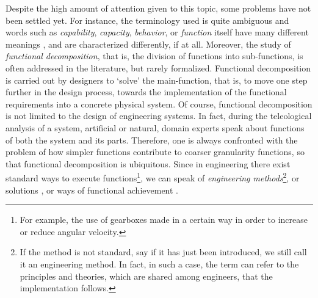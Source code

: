 \documentclass[sw]{iosart2x}
\newcommand{\firstTimeKeyWord}[1]{\textit{#1}}
\newcommand{\quotes}[1]{`#1'}
\newcommand{\myComment}[1]{}
\begin{document}
Despite the high amount of attention given to this topic, some problems have not been settled yet. 
For instance, the terminology used is quite ambiguous and words such as \firstTimeKeyWord{capability}, \firstTimeKeyWord{capacity}, \firstTimeKeyWord{behavior}, or \firstTimeKeyWord{function} itself have many different meanings \cite{borgoCapabilitiesCapacitiesFunctionalities2021, erdenReviewFunctionModeling2008}, and are characterized differently, if at all\myComment{, depending on the author}.
Moreover, the study of \firstTimeKeyWord{functional decomposition}, that is, the division of functions into sub-functions, is often addressed in the literature, but rarely formalized.
Functional decomposition is carried out by designers to \quotes{solve} the main-function, that is, to move one step further in the design process, towards the implementation of the functional requirements into a concrete physical system.
Of course, functional decomposition is not limited to the design of engineering systems. 
In fact, during the teleological analysis of a system, artificial or natural, domain experts speak about functions of both the system and its parts.
Therefore, one is always confronted with the problem of how simpler functions contribute to coarser granularity functions, so that functional decomposition is ubiquitous. %
Since in engineering there exist standard ways to execute functions\footnote{For example, the use of gearboxes made in a certain way in order to increase or reduce angular velocity.}, we can speak of \firstTimeKeyWord{engineering methods}\footnote{If the method is not standard, say if it has just been introduced, we still call it an engineering method. In fact, in such a case, the term can refer to the principles and theories, which are shared among engineers, that the implementation follows.}, or solutions \cite{pahl_engineering_2007}, or ways of functional achievement \cite{kitamuraOntologicalModelDevice2006}. \myComment{, the last two terms taken from \cite{pahl_engineering_2007} and \cite{kitamuraOntologicalModelDevice2006} respectively}   
\end{document}
